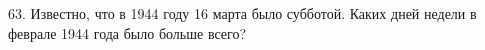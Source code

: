 63. Известно, что в 1944 году 16 марта было субботой. Каких дней недели в феврале 1944 года было больше всего?\\
